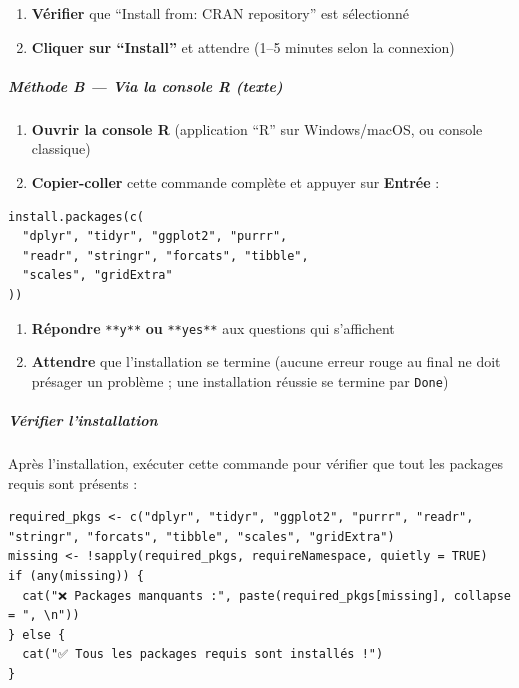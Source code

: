 \begin{enumerate}
\def\labelenumi{\arabic{enumi}.}
\tightlist
\item
  \textbf{Vérifier} que ``Install from: CRAN repository'' est
  sélectionné
\item
  \textbf{Cliquer sur ``Install''} et attendre (1--5 minutes selon la
  connexion)
\end{enumerate}

\subparagraph{Méthode B --- Via la console R
(texte)}\label{muxe9thode-b-via-la-console-r-texte}

\begin{enumerate}
\def\labelenumi{\arabic{enumi}.}
\tightlist
\item
  \textbf{Ouvrir la console R} (application ``R'' sur Windows/macOS, ou
  console classique)
\item
  \textbf{Copier-coller} cette commande complète et appuyer sur
  \textbf{Entrée} :
\end{enumerate}

\begin{verbatim}
install.packages(c(
  "dplyr", "tidyr", "ggplot2", "purrr",
  "readr", "stringr", "forcats", "tibble",
  "scales", "gridExtra"
))
\end{verbatim}

\begin{enumerate}
\def\labelenumi{\arabic{enumi}.}
\tightlist
\item
  \textbf{Répondre} \texttt{**y**} \textbf{ou} \texttt{**yes**} aux
  questions qui s'affichent
\item
  \textbf{Attendre} que l'installation se termine (aucune erreur rouge
  au final ne doit présager un problème ; une installation réussie se
  termine par \texttt{Done})
\end{enumerate}

\subparagraph{Vérifier l'installation}\label{vuxe9rifier-linstallation}

Après l'installation, exécuter cette commande pour vérifier que tout les
packages requis sont présents :

\begin{verbatim}
required_pkgs <- c("dplyr", "tidyr", "ggplot2", "purrr", "readr", "stringr", "forcats", "tibble", "scales", "gridExtra")
missing <- !sapply(required_pkgs, requireNamespace, quietly = TRUE)
if (any(missing)) {
  cat("❌ Packages manquants :", paste(required_pkgs[missing], collapse = ", \n"))
} else {
  cat("✅ Tous les packages requis sont installés !")
}
\end{verbatim}

